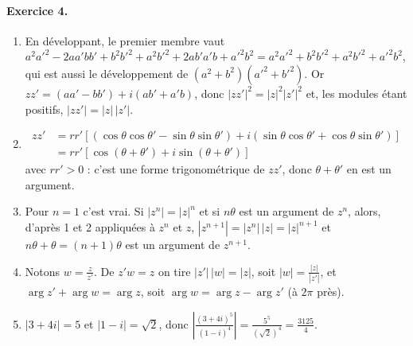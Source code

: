 \begin{corrige}
\paragraph{Exercice 4.}
\begin{enumerate}
\item En d\'eveloppant, le premier membre vaut
      $a^2a'^2 - 2aa'bb' + b^2b'^2 + a^2b'^2 + 2ab'a'b + a'^2b^2 = a^2a'^2 + b^2b'^2 + a^2b'^2 + a'^2b^2$,
      qui est aussi le d\'eveloppement de $(a^2+b^2)(a'^2+b'^2)$.
      Or $zz' = (aa' - bb') + i(ab' + a'b)$, donc $|zz'|^2 = |z|^2|z'|^2$ et, les modules \'etant positifs, $|zz'| = |z|\,|z'|$.
\item \begin{align*}
      zz' & = rr'\left[(\cos\theta\cos\theta' - \sin\theta\sin\theta') + i(\sin\theta\cos\theta' + \cos\theta\sin\theta')\right] \\
          & = rr'\left[\cos(\theta+\theta') + i\sin(\theta+\theta')\right]
      \end{align*}
      avec $rr' > 0$ :
      c'est une forme trigonom\'etrique de $zz'$, donc $\theta+\theta'$ en est un argument.
\item Pour $n = 1$ c'est vrai. Si $|z^n| = |z|^n$ et si $n\theta$ est un argument de $z^n$, alors, d'apr\`es 1 et 2 appliqu\'ees \`a $z^n$ et $z$,
      $|z^{n+1}| = |z^n|\,|z| = |z|^{n+1}$ et $n\theta + \theta = (n+1)\theta$ est un argument de $z^{n+1}$.
\item Notons $w = \frac{z}{z'}$. De $z' w = z$ on tire $|z'|\,|w| = |z|$, soit $|w| = \frac{|z|}{|z'|}$,
      et $\arg z' + \arg w = \arg z$, soit $\arg w = \arg z - \arg z'$ (\`a $2\pi$ pr\`es).
\item $|3 + 4i| = 5$ et $|1 - i| = \sqrt{2}$, donc
      $\left|\frac{(3+4i)^5}{(1-i)^4}\right| = \frac{5^5}{(\sqrt{2})^4} = \boxed{\frac{3125}{4}}$.
\end{enumerate}


\end{corrige}
